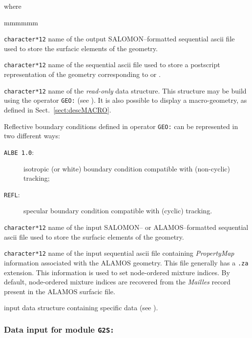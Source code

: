 \noindent where
\begin{ListeDeDescription}{mmmmmm}

\item[\dusa{SURFIL}] \texttt{character*12} name of the output SALOMON--formatted sequential {\sc ascii}
file used to store the surfacic elements of the geometry.

\item[\dusa{PSFIL}] \texttt{character*12} name of the sequential {\sc ascii}
file used to store a postscript representation of the geometry corresponding to  or .

\item[\dusa{GEONAM}] {\tt character*12} name of the {\sl read-only}  data
structure. This structure may be build using the operator {\tt GEO:} (see ). It is also possible to display
a macro-geometry, as defined in Sect.~\ref{sect:descMACRO}.

Reflective boundary conditions defined in operator {\tt GEO:} can be represented in two different ways:
\vspace{-0.2cm}
\begin{description}
\item[{\tt ALBE 1.0}:] isotropic (or white) boundary condition compatible with  (non-cyclic) tracking;
\item[{\tt REFL}:] specular boundary condition compatible with  (cyclic) tracking.
\end{description}

\item[\dusa{SURFIL\_IN}] \texttt{character*12} name of the input SALOMON-- or ALAMOS--formatted sequential {\sc ascii}
file used to store the surfacic elements of the geometry.

\item[\dusa{ZAFIL\_IN}] \texttt{character*12} name of the input sequential {\sc ascii} file containing {\sl PropertyMap}
information associated with the ALAMOS geometry. This file generally has a {\tt .za} extension. This information is used to
set node-ordered mixture indices. By default, node-ordered mixture indices are recovered from the {\sl Mailles} record present
in the ALAMOS surfacic file.

\item[\dusa{G2S\_data}] input data structure containing specific data (see ).
\end{ListeDeDescription}

\subsubsection{Data input for module {\tt G2S:}}\label{sect:descG2S}

